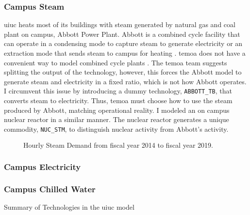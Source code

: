 \subsubsection{Campus Steam}
\gls{uiuc} heats most of its buildings with steam generated by natural gas and
coal plant on campus, Abbott Power Plant. Abbott is a combined cycle facility that
can operate in a condensing mode to capture steam to generate electricity or an
extraction mode that sends steam to campus for heating
\cite{affiliated_engineers_inc_utilities_2015}. \gls{temoa} does not have a
convenient way to model combined cycle plants \cite{decarolis_temoa_2010}. The
\gls{temoa} team suggests splitting the output of the technology, however, this
forces the Abbott model to generate steam and electricity in a fixed ratio, which
is not how Abbott operates. I circumvent this issue by introducing a dummy technology,
\texttt{ABBOTT\_TB}, that converts steam to electricity. Thus, \gls{temoa} must
choose how to use the steam produced by Abbott, matching operational reality.
I modeled an on campus nuclear reactor in a similar manner. The nuclear reactor
generates a unique commodity, \texttt{NUC\_STM}, to distinguish nuclear activity
from Abbott's activity.

\begin{figure}[H]
  \centering
  \resizebox{0.8\columnwidth}{!}{}
  \caption{Hourly Steam Demand from fiscal year 2014 to fiscal year 2019.}
  \label{fig:historical-steam}
\end{figure}

\subsubsection{Campus Electricity}

\subsubsection{Campus Chilled Water}

\begin{table}[H]
  \centering
  \caption{Summary of Technologies in the \gls{uiuc} model}
  \label{tab:uiuc-tech}
  \resizebox{\textwidth}{!}{
  
  } %
\end{table}
